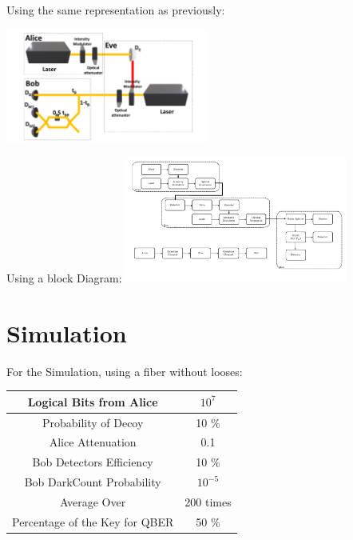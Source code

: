 \documentclass[1000pt]{article}
\newcommand{\mysection}[1]{\section*{\color{black}\sffamily #1}}%
\begin{document}
\begin{multicols}{2}
Using the same representation as previously:

    	\centering
    	\includegraphics[width=0.5\textwidth]{./figures/E.pdf}
    \columnbreak
    
Using a block Diagram:
    	\centering
    	\includegraphics[width=0.55\textwidth]{./figures/Diagrama_de_blocos.pdf}

\end{multicols}    
\mysection{\Huge\textbf{Simulation}} \Large \vspace*{1cm}

For the Simulation, using a fiber without looses:
\begin{table}[hbt!]
\centering
\Large
\begin{tabular}{|c|c|}
\hline
\cellcolor[HTML]{005288}\color{white} Logical Bits from Alice & $10^{7}$\\ \hline
\cellcolor[HTML]{005288}\color{white} Probability of Decoy & 10 \% \\ \hline
\cellcolor[HTML]{005288}\color{white} Alice Attenuation & 0.1\\ \hline
\cellcolor[HTML]{005288}\color{white} Bob Detectors Efficiency  & 10 \% \\ \hline
\cellcolor[HTML]{005288}\color{white} Bob DarkCount Probability & $10^{-5}$ \\ \hline
\cellcolor[HTML]{005288}\color{white} Average Over & 200 times\\ \hline
\cellcolor[HTML]{005288}\color{white} Percentage of the Key for QBER & 50 \% \\ \hline

\end{tabular}
\end{table}
\end{document}
